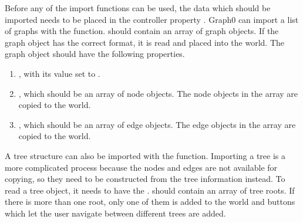 Before any of the import functions can be used, the data which should be imported needs to be placed in the controller property .
Graph0 can import a list of graphs with the  function.  should contain an array of graph objects. If the graph object has the correct format, it is read and placed into the world. The graph object should have the following properties.
\begin{enumerate}
    \item {}, with its value set to .
    \item {}, which should be an array of node objects. The node objects in the array are copied to the world.
    \item {}, which should be an array of edge objects. The edge objects in the array are copied to the world.
\end{enumerate}
A tree structure can also be imported with the  function. Importing a tree is a more complicated process because the nodes and edges are not available for copying, so they need to be constructed from the tree information instead. To read a tree object, it needs to have the .  should contain an array of tree roots. If there is more than one root, only one of them is added to the world and buttons which let the user navigate between different trees are added.